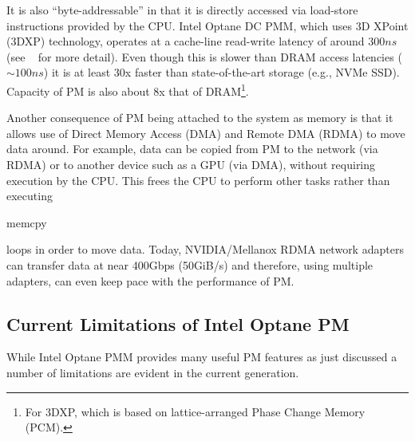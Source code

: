 \documentclass[letterpaper,twocolumn,10pt]{article}
\newcommand{\pmem}{PM\xspace}
\newcommand{\code}[1]{\begin{ttcodefont}#1\end{ttcodefont}}
\begin{document}
It is also ``byte-addressable'' in that it is directly accessed via
load-store instructions provided by the CPU.  Intel Optane DC PMM,
which uses 3D XPoint (3DXP) technology, operates at a cache-line read-write
latency of around $300ns$ (see ~\cite{spectra2020,
  izraelevitz2019basic} for more detail).  Even though this is slower
than DRAM access latencies ($\sim100ns$) it is at least 30x faster
than state-of-the-art storage (e.g., NVMe SSD).  Capacity of \pmem is
also about 8x that of DRAM\footnote{For 3DXP, which is based on
  lattice-arranged Phase Change Memory (PCM).}.

Another consequence of \pmem being attached to the system as memory
is that it allows use of Direct Memory Access (DMA) and
Remote DMA (RDMA) to move data around.  For example, data can be
copied from \pmem to the network (via RDMA) or to another device such as
a GPU (via DMA), without requiring execution by the CPU.  This frees
the CPU to perform other tasks rather than executing \code{memcpy}
loops in order to move data.  Today, NVIDIA/Mellanox RDMA network
adapters can transfer data at near 400Gbps (50GiB/s) and therefore,
using multiple adapters, can even keep pace with the performance of \pmem.

\subsection{Current Limitations of Intel Optane \pmem}

While Intel Optane PMM provides many useful \pmem features as just
discussed a number of limitations are evident in the current generation.
\end{document}
